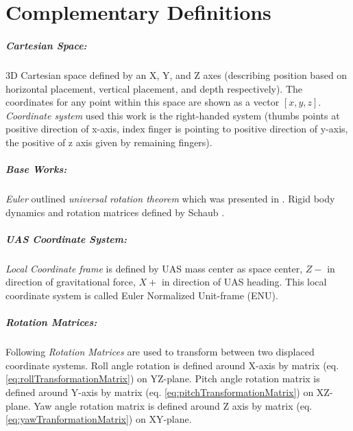 \cleardoublepage
\appendix
\chapter{Complementary Definitions}\label{sec:complementsOfAlgebra}

\paragraph{Cartesian Space:} 3D Cartesian space defined by an X, Y, and Z axes (describing position based on horizontal placement, vertical placement, and depth respectively). The coordinates for any point within this space are shown as a vector $[x,y,z]$. \emph{Coordinate system} used this work is the right-handed system (thumbs points at positive direction of x-axis, index finger is pointing to positive direction of y-axis, the positive  of z axis given by remaining fingers).

\paragraph{Base Works:}\emph{Euler} outlined \emph{universal rotation theorem} which was presented in \cite{euler1775formulae}. Rigid body dynamics and rotation matrices defined by Schaub \cite{schaub2003analytical}. 

\paragraph{UAS Coordinate System:} \emph{Local Coordinate frame} is defined by UAS mass center as space center, $Z-$ in direction of gravitational force, $X+$ in direction of UAS heading. This local coordinate system is called Euler Normalized Unit-frame (ENU). 

\paragraph{Rotation Matrices:} Following \emph{Rotation Matrices} are used to transform between two displaced coordinate systems. Roll angle rotation is defined around X-axis by matrix (eq. \ref{eq:rollTransformationMatrix}) on YZ-plane. Pitch angle  rotation matrix is defined around Y-axis by matrix (eq. \ref{eq:pitchTransformationMatrix}) on XZ-plane. Yaw angle rotation matrix is defined around Z axis by matrix (eq. \ref{eq:yawTranformationMatrix}) on XY-plane.


